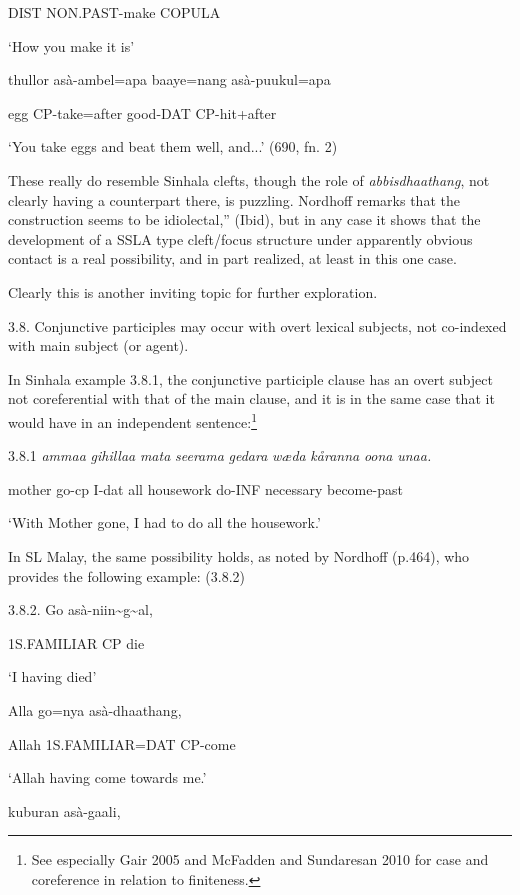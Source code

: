 \documentclass[letterpaper]{article}
\begin{document}
  DIST NON.PAST-make COPULA

  `How you make it is'

   thullor asà-ambel=apa baaye=nang asà-puukul=apa

   egg CP-take=after  good-DAT  CP-hit+after

   `You take eggs and beat them well, and...'  (690, fn. 2)

 These really do resemble Sinhala clefts, though the role of \textit{abbisdhaathang}, not clearly having a counterpart there, is puzzling.  Nordhoff remarks that the construction seems to be idiolectal,'' (Ibid), but in any case it shows that the development of a SSLA type cleft/focus structure under apparently obvious contact is a real possibility, and in part realized, at least in this one case.

 Clearly this is another inviting topic for further exploration.

3.8. 
\ea
\gll Conjunctive participles may occur with overt lexical subjects, not co-indexed with main subject (or agent). 

 In Sinhala example 3.8.1, the conjunctive participle clause has an overt subject not coreferential with that of the main clause, and it is in the same case that it would have in an independent sentence:\footnote{See
  especially Gair 2005 and McFadden and Sundaresan 2010 for case and coreference in relation to finiteness.}

 3.8.1 
\ea
\gll \textit{ammaa} \textit{gihillaa} \textit{mat}\textit{{\dag}}\textit{a} \textit{seerama} \textit{gedara} \textit{w{\ae}d}\textit{{\dag}}\textit{a} \textit{k{\aa}ranna} \textit{oona} \textit{unaa.}

     mother go-cp I-dat all  housework  do-INF  necessary become-past

   `With Mother gone, I had to do all the housework.'  

 In SL Malay, the same possibility holds, as noted by Nordhoff (p.464), who provides the following example: (3.8.2) 

 3.8.2. 
\ea
\gll Go asà-niin{\~{}}g{\~{}}al,

  1S.FAMILIAR CP die

  `I having died'

  Alla go=nya  asà-dhaathang,

  Allah  1S.FAMILIAR=DAT CP-come

  `Allah having come towards me.'

  kuburan asà-gaali,
\end{document}

